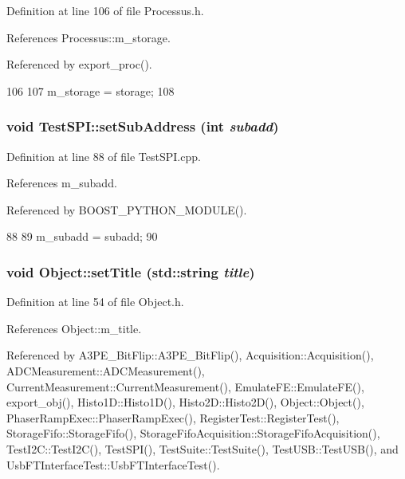 Definition at line 106 of file Processus.h.

References Processus::m\_\-storage.

Referenced by export\_\-proc().


\begin{DoxyCode}
106                                       {
107     m_storage = storage;
108   }
\end{DoxyCode}
\hypertarget{classTestSPI_aef2329f6379983f05038752a1ca3f190}{
\subsubsection[{setSubAddress}]{\setlength{\rightskip}{0pt plus 5cm}void TestSPI::setSubAddress (int {\em subadd})}}
\label{classTestSPI_aef2329f6379983f05038752a1ca3f190}


Definition at line 88 of file TestSPI.cpp.

References m\_\-subadd.

Referenced by BOOST\_\-PYTHON\_\-MODULE().


\begin{DoxyCode}
88                                      {
89   m_subadd = subadd;
90 }
\end{DoxyCode}
\hypertarget{classObject_a89557dbbad5bcaa02652f5d7fa35d20f}{
\subsubsection[{setTitle}]{\setlength{\rightskip}{0pt plus 5cm}void Object::setTitle (std::string {\em title})}}
\label{classObject_a89557dbbad5bcaa02652f5d7fa35d20f}


Definition at line 54 of file Object.h.

References Object::m\_\-title.

Referenced by A3PE\_\-BitFlip::A3PE\_\-BitFlip(), Acquisition::Acquisition(), ADCMeasurement::ADCMeasurement(), CurrentMeasurement::CurrentMeasurement(), EmulateFE::EmulateFE(), export\_\-obj(), Histo1D::Histo1D(), Histo2D::Histo2D(), Object::Object(), PhaserRampExec::PhaserRampExec(), RegisterTest::RegisterTest(), StorageFifo::StorageFifo(), StorageFifoAcquisition::StorageFifoAcquisition(), TestI2C::TestI2C(), TestSPI(), TestSuite::TestSuite(), TestUSB::TestUSB(), and UsbFTInterfaceTest::UsbFTInterfaceTest().


